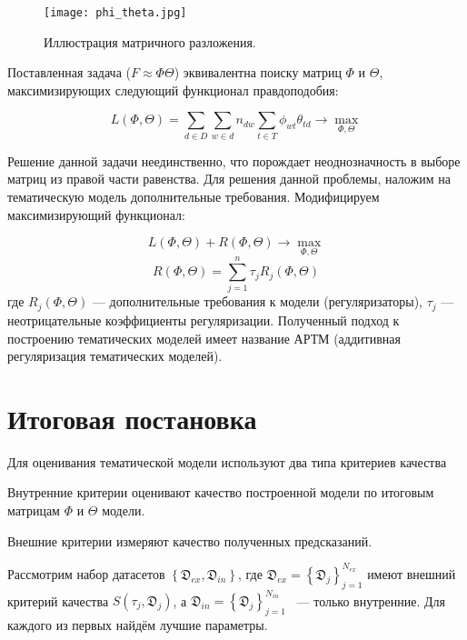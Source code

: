 \documentclass[12pt,twoside]{article}
\begin{document}
	\begin{figure}[h]
		\texttt{[image: phi\_theta.jpg]}
		\caption{Иллюстрация матричного разложения.}
		\label{fg:Example}
	\end{figure}
	
	Поставленная задача ($F \approx \Phi \Theta$) эквивалентна поиску матриц $\Phi$ и $\Theta$, максимизирующих следующий функционал правдоподобия:
	
	\begin{equation}\label{eq_1}
	L(\Phi, \Theta) = \sum_{d \in D} \sum_{w \in d} n_{dw} \sum_{t \in T} \phi_{wt} \theta_{td} \rightarrow \max_{\Phi, \Theta}
	\end{equation}
	
	Решение данной задачи неединственно, что порождает неоднозначность в
	выборе матриц из правой части равенства. Для решения данной проблемы, наложим
	на тематическую модель дополнительные требования. Модифицируем максимизирующий функционал:
	
	\begin{equation}
	L(\Phi, \Theta) + R(\Phi, \Theta) \rightarrow \max_{\Phi, \Theta}
	\end{equation}	
	\begin{equation}	
	R(\Phi, \Theta) = \sum_{j=1}^{n} \tau_j R_j(\Phi, \Theta)
	\end{equation}
	где $R_j(\Phi, \Theta)$ --- дополнительные требования к модели (регуляризаторы),  $\tau_j$ --- неотрицательные коэффициенты регуляризации. Полученный подход к построению тематических моделей имеет название АРТМ (аддитивная регуляризация тематических моделей).
	
	\section{Итоговая постановка}
	
	Для оценивания тематической модели используют два типа критериев качества
	
	\begin{Def}
		Внутренние критерии оценивают качество построенной модели по итоговым матрицам $\Phi$ и $\Theta$ модели.
	\end{Def}
	
	\begin{Def}
		Внешние критерии измеряют качество полученных предсказаний.
	\end{Def}
	
	Рассмотрим набор датасетов $\left\{\mathfrak{D}_{ex}, \mathfrak{D}_{in}\right\}$, где  $\mathfrak{D}_{ex} = \left\{\mathfrak{D}_j\right\}_{j=1}^{N_{ex}}$ имеют внешний критерий качества $S(\tau_j, \mathfrak{D}_j)$, а $\mathfrak{D}_{in} = \left\{\mathfrak{D}_j\right\}_{j=1}^{N_{in}}$~ --- только внутренние. Для каждого из первых найдём лучшие параметры.
	
\end{document}
